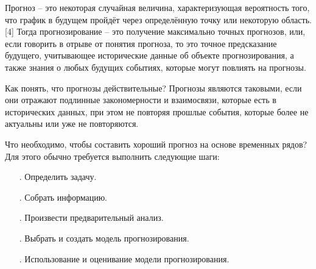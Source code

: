 {\gostFont
	
	\par \redline Прогноз {--} это некоторая случайная величина, характеризующая вероятность того, что график в будущем пройдёт через определённую точку или некоторую область.[4] Тогда прогнозирование {--} это получение максимально точных прогнозов, или, если говорить в отрыве от понятия прогноза, то это точное предсказание будущего, учитывающее исторические данные об объекте прогнозирования, а также знания о любых будущих событиях, которые могут повлиять на прогнозы. 
	
	\par \redline Как понять, что прогнозы действительные? Прогнозы являются таковыми, если они отражают подлинные закономерности и взаимосвязи, которые есть в исторических данных, при этом не повторяя прошлые события, которые более не актуальны или уже не повторяются. 
	
	\par \redline Что необходимо, чтобы составить хороший прогноз на основе временных рядов? Для этого обычно требуется выполнить следующие шаги:
	
	
	\begin{itemize}[leftmargin=2.15cm, labelwidth=0.65cm, labelsep=0.0cm] 
		
		\item[\theitemcntr. ] Определить задачу. 
		\addtocounter{itemcntr}{1}
		
		\item[\theitemcntr. ] Собрать информацию.
		\addtocounter{itemcntr}{1}
		
		\item[\theitemcntr. ] Произвести предварительный анализ.
		\addtocounter{itemcntr}{1}
		
		\item[\theitemcntr. ] Выбрать и создать модель прогнозирования.
		\addtocounter{itemcntr}{1}
		
		\item[\theitemcntr. ] Использование и оценивание модели прогнозирования. 
		\addtocounter{itemcntr}{1}
		
		\setcounter{itemcntr}{1}
	\end{itemize}
	
}

